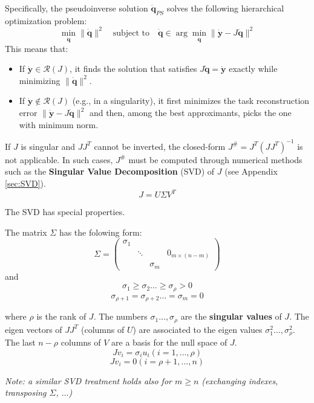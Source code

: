 Specifically, the pseudoinverse solution $\dot{\mathbf{q}}_{PS}$ solves the following hierarchical optimization problem:
\begin{equation}
    \min_{\dot{\mathbf{q}}} \|\dot{\mathbf{q}}\|^2 \quad \text{subject to} \quad \dot{\mathbf{q}} \in \arg\min_{\dot{\mathbf{q}}} \|\dot{\mathbf{y}} - J\dot{\mathbf{q}}\|^2
\end{equation}
This means that:
\begin{itemize}
    \item If $\dot{\mathbf{y}} \in \mathcal{R}(J)$, it finds the solution that satisfies $J\dot{\mathbf{q}} = \dot{\mathbf{y}}$ exactly while minimizing $\|\dot{\mathbf{q}}\|^2$.
    \item If $\dot{\mathbf{y}} \notin \mathcal{R}(J)$ (e.g., in a singularity), it first minimizes the task reconstruction error $\|\dot{\mathbf{y}} - J\dot{\mathbf{q}}\|^2$ and then, 
    among the best approximants, picks the one with minimum norm.
\end{itemize}

If $J$ is singular and $JJ^T$ cannot be inverted, the closed-form $J^\# = J^T(JJ^T)^{-1}$ is not applicable. 
In such cases, $J^\#$ must be computed through numerical methods such as the \textbf{Singular Value Decomposition} (SVD) of $J$ (see Appendix \ref{sec:SVD}).
\begin{equation}
    J = U \Sigma V^T
\end{equation}

The SVD has special properties. 

The matrix $\Sigma$ has the folowing form:
$$
    \Sigma=\begin{pmatrix}
        \sigma_1 & & & \\ 
        & \ddots & & 0_{m\times (n-m)}\\ 
        & & \sigma_m & 
    \end{pmatrix}
$$
and
$$ \sigma_1\ge\sigma_2\dots \ge \sigma_\rho>0 $$
$$ \sigma_{\rho+1}= \sigma_{\rho+2}\dots = \sigma_{m}=0 $$

where $\rho$ is the rank of $J$.
The numbers $\sigma_1\dots ,\sigma_\rho$ are the \textbf{singular values} of $J$. 
The eigen vectors of $JJ^T$ (columns of $U$) are associated to the eigen values $\sigma_1^2\dots,\sigma_\rho^2$.
The last $n-\rho$ columns of $V$ are a basis for the null space of $J$. 
$$ Jv_i = \sigma_iu_i (i = 1, \dots, \rho)$$
$$ Jv_i = 0 (i = \rho+1, \dots, n)$$

\textit{Note: a similar SVD treatment holds also for $ m \geq n $ (exchanging indexes, transposing $\Sigma$, $\dots$)}




